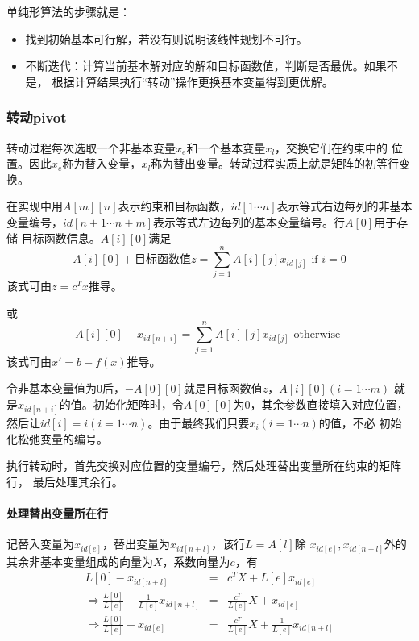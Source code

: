 单纯形算法的步骤就是：
\begin{itemize}
    \item 找到初始基本可行解，若没有则说明该线性规划不可行。
    \item 不断迭代：计算当前基本解对应的解和目标函数值，判断是否最优。如果不是，
    根据计算结果执行``转动''操作更换基本变量得到更优解。
\end{itemize}
\subsubsection{转动pivot}
转动过程每次选取一个非基本变量$x_e$和一个基本变量$x_l$，交换它们在约束中的
位置。因此$x_e$称为替入变量，$x_l$称为替出变量。转动过程实质上就是矩阵的初等行变换。

在实现中用$A[m][n]$表示约束和目标函数，$id[1\cdots n]$表示等式右边每列的非基本
变量编号，$id[n+1\cdots n+m]$表示等式左边每列的基本变量编号。行$A[0]$用于存储
目标函数信息。$A[i][0]$满足
\begin{displaymath}
    A[i][0]+\textrm{目标函数值}z=\sum_{j=1}^n{A[i][j]x_{id[j]}}\textrm{~if~}i=0
\end{displaymath}
该式可由$z=c^Tx$推导。

或
\begin{displaymath}
    A[i][0]-x_{id[n+i]}=\sum_{j=1}^n{A[i][j]x_{id[j]}}\textrm{~otherwise~}
\end{displaymath}
该式可由$x'=b-f(x)$推导。

令非基本变量值为0后，$-A[0][0]$就是目标函数值$z$，$A[i][0](i=1\cdots m)$
就是$x_{id[n+i]}$的值。初始化矩阵时，令$A[0][0]$为0，其余参数直接填入对应位置，
然后让$id[i]=i(i=1\cdots n)$。由于最终我们只要$x_i(i=1\cdots n)$的值，不必
初始化松弛变量的编号。

执行转动时，首先交换对应位置的变量编号，然后处理替出变量所在约束的矩阵行，
最后处理其余行。

\paragraph{处理替出变量所在行}
记替入变量为$x_{id[e]}$，替出变量为$x_{id[n+l]}$，该行$L=A[l]$除
$x_{id[e]},x_{id[n+l]}$外的其余非基本变量组成的向量为$X$，系数向量为$c$，有
\begin{eqnarray*}
    L[0]-x_{id[n+l]}&=&c^TX+L[e]x_{id[e]}\\
    \Rightarrow \frac{L[0]}{L[e]}-\frac{1}{L[e]}x_{id[n+l]}&=&
    \frac{c^T}{L[e]}X+x_{id[e]}\\
    \Rightarrow \frac{L[0]}{L[e]}-x_{id[e]}&=&
    \frac{c^T}{L[e]}X+\frac{1}{L[e]}x_{id[n+l]}
\end{eqnarray*}

